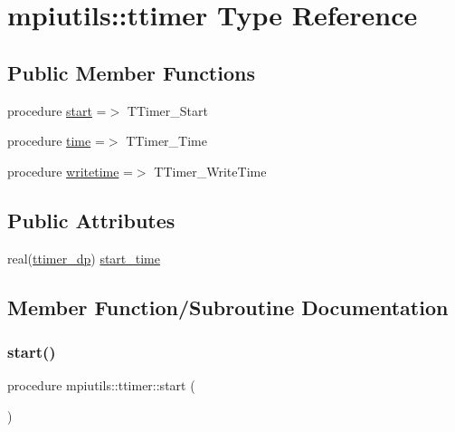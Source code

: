 \hypertarget{structmpiutils_1_1ttimer}{}\section{mpiutils\+:\+:ttimer Type Reference}
\label{structmpiutils_1_1ttimer}
\subsection*{Public Member Functions}
\begin{DoxyCompactItemize}
\item 
procedure \mbox{\hyperlink{structmpiutils_1_1ttimer_ac0f3b6de7c0b2ee03bae277c024e2f32}{start}} =$>$ T\+Timer\+\_\+\+Start
\item 
procedure \mbox{\hyperlink{structmpiutils_1_1ttimer_a96e49bfa1d71d98bbd0bab99dcd05a60}{time}} =$>$ T\+Timer\+\_\+\+Time
\item 
procedure \mbox{\hyperlink{structmpiutils_1_1ttimer_a10b06e96944b2e20e31da864e70f960b}{writetime}} =$>$ T\+Timer\+\_\+\+Write\+Time
\end{DoxyCompactItemize}
\subsection*{Public Attributes}
\begin{DoxyCompactItemize}
\item 
real(\mbox{\hyperlink{namespacempiutils_a29264c4652e8287096a27ca2675edc26}{ttimer\+\_\+dp}}) \mbox{\hyperlink{structmpiutils_1_1ttimer_a20d96cb9a3fefe1eca748762d6ac5632}{start\+\_\+time}}
\end{DoxyCompactItemize}


\subsection{Member Function/\+Subroutine Documentation}
\mbox{\label{structmpiutils_1_1ttimer_ac0f3b6de7c0b2ee03bae277c024e2f32}} 
\subsubsection{\texorpdfstring{start()}{start()}}
{\footnotesize\ttfamily procedure mpiutils\+::ttimer\+::start (\begin{DoxyParamCaption}{ }\end{DoxyParamCaption})}

